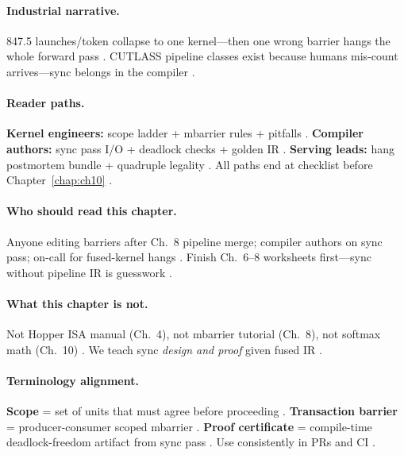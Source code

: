\paragraph{Industrial narrative.}
847.5 launches/token collapse to one kernel---then one wrong barrier hangs the whole forward pass \citep{taxbreak2026,mpk2025,patel2025llminference}.
CUTLASS pipeline classes exist because humans mis-count arrives---sync belongs in the compiler \citep{shah2024flashattention3,yirage2026,chen2020compilerbasedhardw}.

\paragraph{Reader paths.}
\textbf{Kernel engineers:} scope ladder + mbarrier rules + pitfalls \citep{shah2024flashattention3,semianalysis2024tma}.
\textbf{Compiler authors:} sync pass I/O + deadlock checks + golden IR \citep{yirage2026,wu2024mirage,mpk2025}.
\textbf{Serving leads:} hang postmortem bundle + quadruple legality \citep{taxbreak2026,patel2025llminference}.
All paths end at checklist before Chapter~\ref{chap:ch10} \citep{dao2022flashattention,memoryfloor2026}.

\paragraph{Who should read this chapter.}
Anyone editing barriers after Ch.~8 pipeline merge; compiler authors on sync pass; on-call for fused-kernel hangs \citep{yirage2026,shah2024flashattention3,mpk2025}.
Finish Ch.~6--8 worksheets first---sync without pipeline IR is guesswork \citep{semianalysis2024tma,chen2020compilerbasedhardw,taxbreak2026}.

\paragraph{What this chapter is not.}
Not Hopper ISA manual (Ch.~4), not mbarrier tutorial (Ch.~8), not softmax math (Ch.~10) \citep{nvidia2022hopper,dao2022flashattention,semianalysis2024tma}.
We teach sync \emph{design and proof} given fused IR \citep{yirage2026,mpk2025}.

\paragraph{Terminology alignment.}
\textbf{Scope} = set of units that must agree before proceeding \citep{shah2024flashattention3,nvidia2022hopper}.
\textbf{Transaction barrier} = producer-consumer scoped mbarrier \citep{semianalysis2024tma,dao2022flashattention}.
\textbf{Proof certificate} = compile-time deadlock-freedom artifact from sync pass \citep{yirage2026,wu2024mirage}.
Use consistently in PRs and CI \citep{chen2020compilerbasedhardw,taxbreak2026}.

